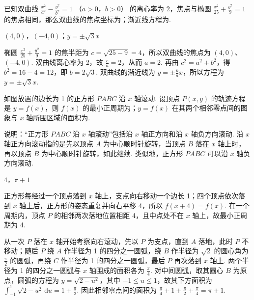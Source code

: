 \begin{problem}
已知双曲线 \(\frac{x^2}{a^2} - \frac{y^2}{b^2} = 1\) （\(a > 0\)，\(b > 0\)） 的离心率为 2，焦点与椭圆 \(\frac{x^2}{25} + \frac{y^2}{9} = 1\) 的焦点相同，那么双曲线的焦点坐标为\fillinblank{}；渐近线方程为\fillinblank{}.
\end{problem}

\begin{answer}
\((4,0)\)，\((-4,0)\)；\(y=\pm\sqrt{3}x\)
\end{answer}

\begin{solution}
椭圆 \(\frac{x^{2}}{25}+\frac{y^{2}}{9}=1\) 的焦半距为 \(c=\sqrt{25-9}=4\)，所以双曲线的焦点为 \((4,0)\)、\((-4,0)\). 双曲线离心率为 2，故 \(\frac{c}{a}=2\)，从而 \(a=2\). 再由 \(c^{2}=a^{2}+b^{2}\)，得 \(b^{2}=16-4=12\)，即 \(b=2\sqrt{3}\). 双曲线的渐近线为 \(y=\pm\frac{b}{a}x\)，所以方程为 \(y=\pm\sqrt{3}x\).
\end{solution}

\begin{problem}
如图放置的边长为 1 的正方形 \(PABC\) 沿 \(x\) 轴滚动.
设顶点 \(P(x, y)\) 的轨迹方程是 \(y = f(x)\)，则 \(f(x)\) 的最小正周期为\fillinblank{}；\(y = f(x)\) 在其两个相邻零点间的图象与 \(x\) 轴所围区域的面积为\fillinblank{}.

说明：“正方形 \(PABC\) 沿 \(x\) 轴滚动”包括沿 \(x\) 轴正方向和沿 \(x\) 轴负方向滚动. 沿 \(x\) 轴正方向滚动指的是先以顶点 \(A\) 为中心顺时针旋转，当顶点 \(B\) 落在 \(x\) 轴上时，再以顶点 \(B\) 为中心顺时针旋转，如此继续. 类似地，正方形 \(PABC\) 可以沿 \(x\) 轴负方向滚动.
\end{problem}

\begin{answer}
\(4\)，\(\pi+1\)
\end{answer}

\begin{solution}
正方形每经过一个顶点落到 \(x\) 轴上，支点向右移动一个边长 1；四个顶点依次落到 \(x\) 轴上后，正方形的姿态重复并向右平移 4，所以 \(f(x+4)=f(x)\). 在一个周期内，顶点 \(P\) 的相邻两次落地位置相距 4，且中点处不在 \(x\) 轴上，故最小正周期为 4.

从一次 \(P\) 落在 \(x\) 轴开始考察向右滚动，先以 \(P\) 为支点，直到 \(A\) 落地，此时 \(P\) 不移动；随后 \(P\) 绕 \(A\) 作半径为 1 的四分之一圆弧，绕 \(B\) 作半径为 \(\sqrt{2}\) 的圆心角为 \(\frac{\pi}{2}\) 的圆弧，再绕 \(C\) 作半径为 1 的四分之一圆弧，最后 \(P\) 再次落到 \(x\) 轴上. 两个半径为 1 的四分之一圆弧与 \(x\) 轴围成的面积各为 \(\frac{\pi}{4}\). 对中间圆弧，取其圆心 \(B\) 为原点，圆弧的方程为 \(y=\sqrt{2-u^{2}}\)，其中 \(-1\leqslant u\leqslant1\)，故其下方面积为 \(\displaystyle\int_{-1}^{1}\sqrt{2-u^{2}}\,\mathrm{d}u=1+\frac{\pi}{2}\). 因此相邻零点间的面积为 \(\frac{\pi}{4}+1+\frac{\pi}{2}+\frac{\pi}{4}=\pi+1\).
\end{solution}

